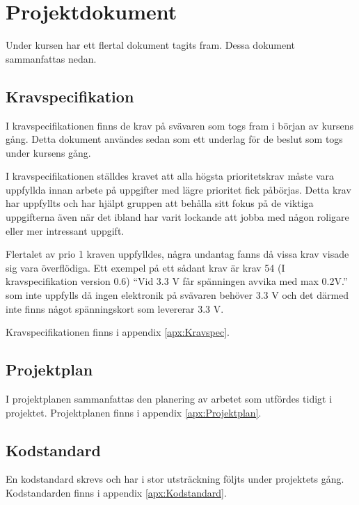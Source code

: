 \section{Projektdokument}
Under kursen har ett flertal dokument tagits fram. Dessa dokument sammanfattas nedan.
\subsection{Kravspecifikation}
I kravspecifikationen finns de krav på svävaren som togs fram i början av kursens gång. 
Detta dokument användes sedan som ett underlag för de beslut som togs under kursens gång.

I kravspecifikationen ställdes kravet att alla högsta prioritetskrav måste vara uppfyllda innan 
arbete på uppgifter med lägre prioritet fick påbörjas. Detta krav har uppfyllts och har hjälpt 
gruppen att behålla sitt fokus på de viktiga uppgifterna även när det ibland har varit lockande 
att jobba med någon roligare eller mer intressant uppgift.

Flertalet av prio 1 kraven uppfylldes, några undantag fanns då vissa krav visade sig vara överflödiga.
Ett exempel på ett sådant krav är krav 54 (I kravspecifikation version 0.6) ``Vid 3.3 V får spänningen
avvika med max 0.2V.'' som inte uppfylls då ingen elektronik på svävaren behöver 3.3 V och det därmed inte 
finns något spänningskort som levererar 3.3 V.

Kravspecifikationen finns i appendix \ref{apx:Kravspec}.
\subsection{Projektplan}
I projektplanen sammanfattas den planering av arbetet som utfördes tidigt i
projektet. Projektplanen finns i appendix \ref{apx:Projektplan}.
\subsection{Kodstandard}
En kodstandard skrevs och har i stor utsträckning följts under projektets gång.
Kodstandarden finns i appendix \ref{apx:Kodstandard}.
